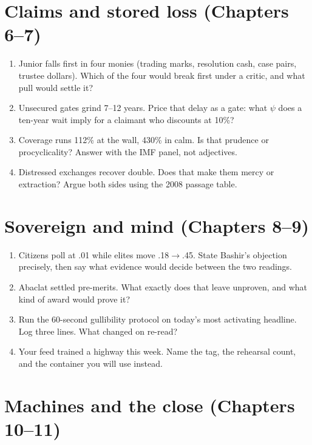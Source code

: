 \section*{Claims and stored loss (Chapters 6--7)}

\begin{enumerate}
\item Junior falls first in four monies (trading marks, resolution cash, case pairs, trustee dollars). Which of the four would break first under a critic, and what pull would settle it?
\item Unsecured gates grind 7--12 years. Price that delay as a gate: what $\psi$ does a ten-year wait imply for a claimant who discounts at 10\%?
\item Coverage runs 112\% at the wall, 430\% in calm. Is that prudence or procyclicality? Answer with the IMF panel, not adjectives.
\item Distressed exchanges recover double. Does that make them mercy or extraction? Argue both sides using the 2008 passage table.
\end{enumerate}

\section*{Sovereign and mind (Chapters 8--9)}

\begin{enumerate}
\item Citizens poll at .01 while elites move .18$\to$.45. State Bashir's objection precisely, then say what evidence would decide between the two readings.
\item Abaclat settled pre-merits. What exactly does that leave unproven, and what kind of award would prove it?
\item Run the 60-second gullibility protocol on today's most activating headline. Log three lines. What changed on re-read?
\item Your feed trained a highway this week. Name the tag, the rehearsal count, and the container you will use instead.
\end{enumerate}

\section*{Machines and the close (Chapters 10--11)}

